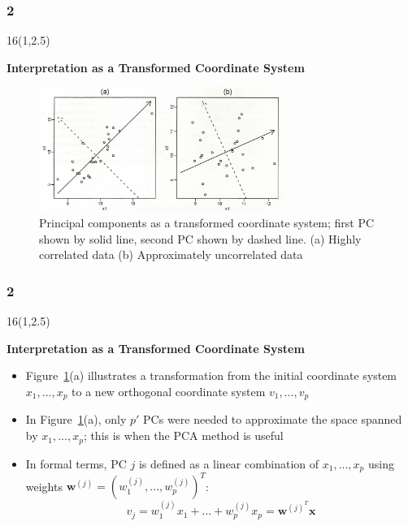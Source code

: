 \documentclass{beamer}
\newcommand\FrameText[1]{
\begin{textblock}{16}(1,2.5)
\raggedright #1
\end{textblock}}
\begin{document}
\begin{frame}
\frametitle{2}
\FrameText{\bf{\large Interpretation as a Transformed Coordinate System}}
\begin{figure}
\centering
\includegraphics[width=8cm]{2DPCA.png}
\caption{Principal components as a transformed coordinate system; first PC shown by solid line, second PC shown by dashed line. (a) Highly correlated data (b) Approximately uncorrelated data}
\label{PCAExample}
\end{figure}
\end{frame}

\begin{frame}
\frametitle{2}
\FrameText{\bf{\large Interpretation as a Transformed Coordinate System}}
\begin{itemize}
\item Figure~\ref{PCAExample}(a) illustrates a transformation from the initial coordinate system $x_1,...,x_p$ to a new orthogonal coordinate system $v_1,...,v_p$
\item In Figure~\ref{PCAExample}(a), only $p'$ PCs were needed to approximate the space spanned by $x_1,...,x_p$; this is when the PCA method is useful
\item In formal terms, PC $j$ is defined as a linear combination
  of $x_1,...,x_p$ using weights
  $\mathbf{w}^{(j)}=(w_1^{(j)},...,w_p^{(j)})^T$:
\begin{equation}
v_j=w_1^{(j)}x_1+...+w_p^{(j)}x_p=\mathbf{w}^{{(j)}^T}\mathbf{x}
\end{equation}                       
\end{itemize}
\end{frame}
\end{document}
